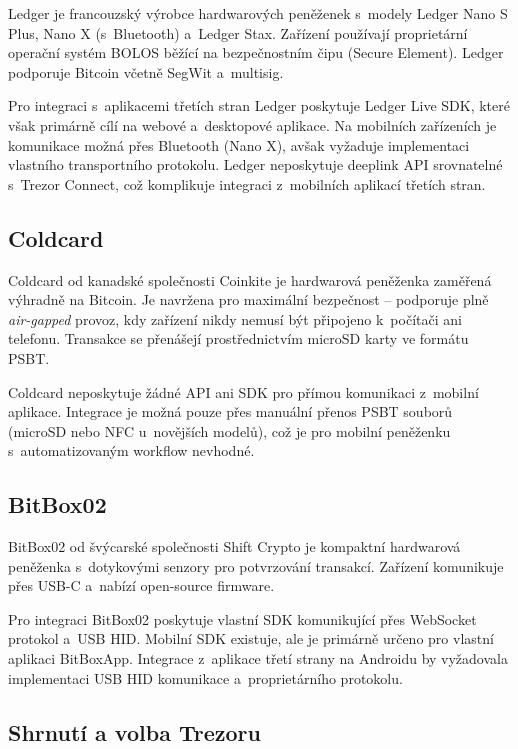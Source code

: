 Ledger je francouzský výrobce hardwarových peněženek s~modely Ledger Nano S
Plus, Nano X (s~Bluetooth) a~Ledger Stax. Zařízení používají proprietární
operační systém BOLOS běžící na bezpečnostním čipu (Secure Element).
Ledger podporuje Bitcoin včetně SegWit a~multisig.

Pro integraci s~aplikacemi třetích stran Ledger poskytuje Ledger Live SDK,
které však primárně cílí na webové a~desktopové aplikace. Na mobilních
zařízeních je komunikace možná přes Bluetooth (Nano X), avšak vyžaduje
implementaci vlastního transportního protokolu. Ledger neposkytuje
deeplink API srovnatelné s~Trezor Connect, což komplikuje integraci
z~mobilních aplikací třetích stran.

\subsection{Coldcard}
\label{sec:coldcard}

Coldcard od kanadské společnosti Coinkite je hardwarová peněženka zaměřená
výhradně na Bitcoin. Je navržena pro maximální bezpečnost -- podporuje
plně \emph{air-gapped} provoz, kdy zařízení nikdy nemusí být připojeno
k~počítači ani telefonu. Transakce se přenášejí prostřednictvím microSD
karty ve formátu PSBT.

Coldcard neposkytuje žádné API ani SDK pro přímou komunikaci z~mobilní
aplikace. Integrace je možná pouze přes manuální přenos PSBT souborů
(microSD nebo NFC u~novějších modelů), což je pro mobilní peněženku
s~automatizovaným workflow nevhodné.

\subsection{BitBox02}
\label{sec:bitbox02}

BitBox02 od švýcarské společnosti Shift Crypto je kompaktní hardwarová
peněženka s~dotykovými senzory pro potvrzování transakcí. Zařízení
komunikuje přes USB-C a~nabízí open-source firmware.

Pro integraci BitBox02 poskytuje vlastní SDK komunikující přes WebSocket
protokol a~USB HID. Mobilní SDK existuje, ale je primárně určeno pro
vlastní aplikaci BitBoxApp. Integrace z~aplikace třetí strany na Androidu
by vyžadovala implementaci USB HID komunikace a~proprietárního protokolu.

\subsection{Shrnutí a volba Trezoru}

